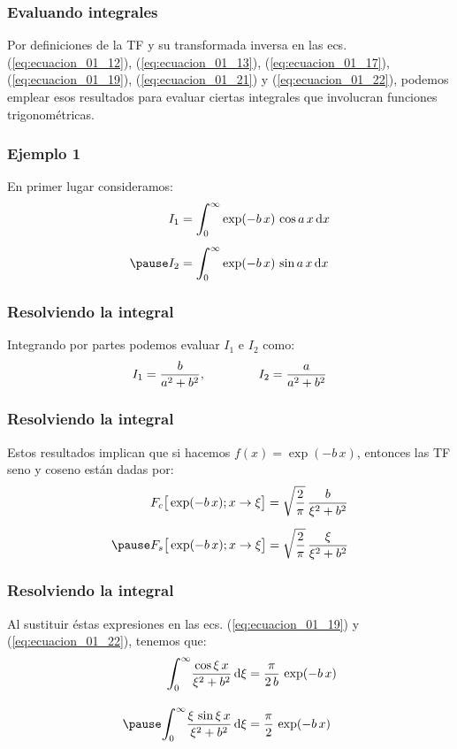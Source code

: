 \begin{frame}
\frametitle{Evaluando integrales}
Por definiciones de la TF y su transformada inversa en las ecs. (\ref{eq:ecuacion_01_12}), (\ref{eq:ecuacion_01_13}), (\ref{eq:ecuacion_01_17}), (\ref{eq:ecuacion_01_19}), (\ref{eq:ecuacion_01_21}) y (\ref{eq:ecuacion_01_22}), podemos emplear esos resultados para evaluar ciertas integrales que involucran funciones trigonométricas. 
\end{frame}
\begin{frame}
\frametitle{Ejemplo 1}
En primer lugar consideramos:
\pause
\begin{eqnarray*}
\begin{aligned}
I_{1} &= \scaleint{6ex}_{\bs 0}^{\infty} \exp (-b \, x) \, \cos a \, x \dd{x} \\[0.5em] \pause
I_{2} &= \scaleint{6ex}_{\bs 0}^{\infty} \exp (-b \, x) \, \sin a \, x \dd{x}
\end{aligned}
\end{eqnarray*}
\end{frame}
\begin{frame}
\frametitle{Resolviendo la integral}
Integrando por partes podemos evaluar $I_{1}$ e $I_{2}$ como:
\pause
\begin{align*}
I_{1} = \dfrac{b}{a^{2} + b^{2}},  \hspace{1.5cm} I_{2} = \dfrac{a}{a^{2} + b^{2}}
\end{align*}
\end{frame}
\begin{frame}
\frametitle{Resolviendo la integral}
Estos resultados implican que si hacemos $f (x) = \exp(-b \, x)$, entonces las TF seno y coseno están dadas por:
\pause
\begin{eqnarray*}
\begin{aligned}
&F_{c} \big[ \exp(-b \, x); x \to \xi \big] = \sqrt{\dfrac{2}{\pi}} \, \dfrac{b}{\xi^{2} + b^{2}} \\[0.5em] \pause
&F_{s} \big[ \exp(-b \, x); x \to \xi \big] = \sqrt{\dfrac{2}{\pi}} \, \dfrac{\xi}{\xi^{2} + b^{2}}
\end{aligned}
\end{eqnarray*}
\end{frame}
\begin{frame}
\frametitle{Resolviendo la integral}
Al sustituir éstas expresiones en las ecs. (\ref{eq:ecuacion_01_19}) y (\ref{eq:ecuacion_01_22}), tenemos que:
\pause
\begin{eqnarray*}
\begin{aligned}
\scaleint{6ex}_{\bs 0}^{\infty} \dfrac{\cos \xi \, x}{\xi^{2} + b^{2}} \dd{\xi} &= \dfrac{\pi}{2 \, b} \, \exp(-b \, x) \\[1em] \pause
\scaleint{6ex}_{\bs 0}^{\infty} \dfrac{\xi \, \sin \xi \, x}{\xi^{2} + b^{2}} \dd{\xi} &= \dfrac{\pi}{2} \, \exp(-b \, x)
\end{aligned}
\end{eqnarray*}
\end{frame}

